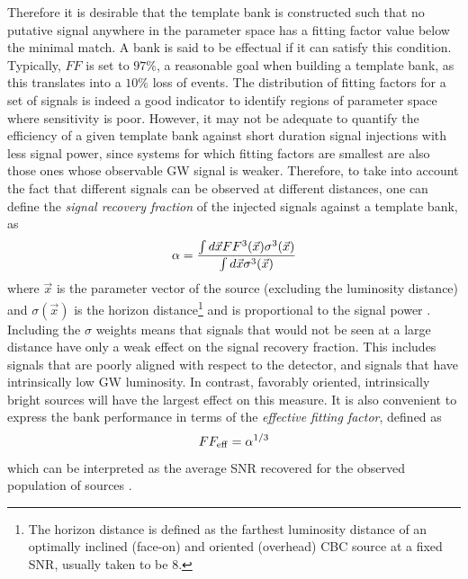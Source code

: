 \documentclass[binding=0.6cm, LaM]{sapthesis}
\begin{document}
	Therefore it is desirable that the template bank is constructed such that 
	no putative signal anywhere in the parameter space
	has a fitting factor value below the minimal match. 
	A bank is said to be effectual if it can satisfy this condition.
	Typically, $FF$ is set to $97\%$, a reasonable goal when building a template bank, 
	as this translates into a $10\%$ loss of events.
	The distribution of fitting factors for a set of signals is indeed a good indicator to identify regions of parameter space where sensitivity is poor.
	However, it may not be adequate to quantify the efficiency of a given template bank against short duration signal injections with less signal power,
	since systems for which fitting factors are smallest are also those ones whose observable GW signal is weaker. 
	Therefore, to take into account the fact that different signals can be observed at different distances, 
	one can define the \emph{signal recovery fraction} of the injected signals against a template bank, as
	\begin{equation}
          \alpha = {{\int d \vec{x} FF^3(\vec{x}) \sigma^3(\vec{x})} \over {\int d \vec{x} \sigma^3(\vec{x})}}
	\end{equation}
	where $\vec{x}$ is the parameter vector of the source (excluding the luminosity distance) 
	and $\sigma(\vec{x})$ is the horizon distance\footnote{The horizon distance is defined as the farthest luminosity distance of an optimally inclined (face-on) and oriented (overhead) CBC source at a fixed SNR, usually taken to be 8.} 
	and is proportional to the signal power \cite{125}. 
	Including the $\sigma$ weights means that signals that 
	would not be seen at a large distance have only a weak effect on the signal recovery fraction. 
	This includes signals that are poorly aligned with respect to the detector, 
	and signals that have intrinsically low GW luminosity. 
	In contrast, favorably oriented, intrinsically bright sources will have the largest effect on this measure. 
	It is also convenient to express the bank performance in terms of the \emph{effective fitting factor}, defined as 
	\begin{equation}
	FF_{\rm eff} = \alpha^{1/3}
	\end{equation}
	which can be interpreted as the average SNR recovered for the observed population of sources \cite{38}.
\end{document}
